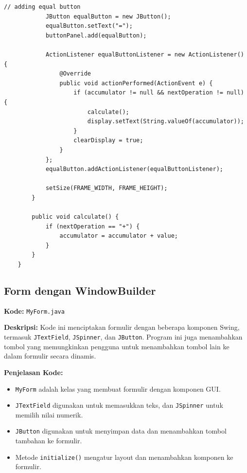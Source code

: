 \begin{lstlisting}[style=JavaStyle]
			// adding equal button
			JButton equalButton = new JButton();
			equalButton.setText("=");
			buttonPanel.add(equalButton);
			
			ActionListener equalButtonListener = new ActionListener() {
				@Override
				public void actionPerformed(ActionEvent e) {
					if (accumulator != null && nextOperation != null) {
						calculate();
						display.setText(String.valueOf(accumulator));
					}
					clearDisplay = true;
				}
			};
			equalButton.addActionListener(equalButtonListener);
			
			setSize(FRAME_WIDTH, FRAME_HEIGHT);
		}
		
		public void calculate() {
			if (nextOperation == "+") {
				accumulator = accumulator + value;
			}
		}
	}
\end{lstlisting}



\subsection{Form dengan WindowBuilder}

\textbf{Kode:} \texttt{MyForm.java}

\textbf{Deskripsi:} Kode ini menciptakan formulir dengan beberapa komponen Swing, termasuk \texttt{JTextField}, \texttt{JSpinner}, dan \texttt{JButton}. Program ini juga menambahkan tombol yang memungkinkan pengguna untuk menambahkan tombol lain ke dalam formulir secara dinamis.

\textbf{Penjelasan Kode:}
\begin{itemize}
	\item \texttt{MyForm} adalah kelas yang membuat formulir dengan komponen GUI.
	\item \texttt{JTextField} digunakan untuk memasukkan teks, dan \texttt{JSpinner} untuk memilih nilai numerik.
	\item \texttt{JButton} digunakan untuk menyimpan data dan menambahkan tombol tambahan ke formulir.
	\item Metode \texttt{initialize()} mengatur layout dan menambahkan komponen ke formulir.
\end{itemize}

